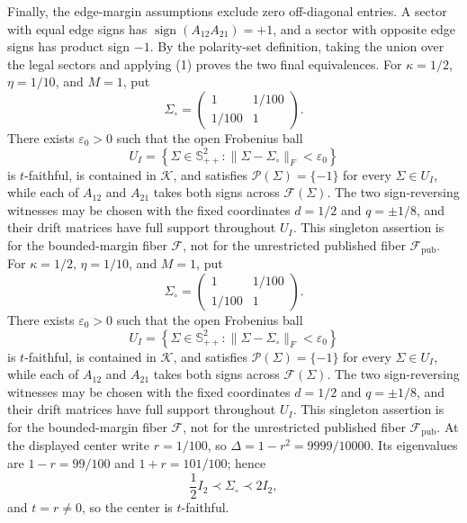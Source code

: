 Finally, the edge-margin assumptions exclude zero off-diagonal entries. A sector with equal edge signs has \(\operatorname{sign}(A_{12}A_{21})=+1\), and a sector with opposite edge signs has product sign \(-1\). By the polarity-set definition, taking the union over the legal sectors and applying (1) proves the two final equivalences.
For \(\kappa=1/2\), \(\eta=1/10\), and \(M=1\), put
\[
\Sigma_{\circ}=\begin{pmatrix}1&1/100\\1/100&1\end{pmatrix}.
\]
There exists \(\varepsilon_0>0\) such that the open Frobenius ball
\[
U_I=\left\{\Sigma\in\mathbb S_{++}^{2}:\lVert\Sigma-\Sigma_{\circ}\rVert_F<\varepsilon_0\right\}
\]
is \(t\)-faithful, is contained in \(\mathcal K\), and satisfies \(\mathcal P(\Sigma)=\{-1\}\) for every \(\Sigma\in U_I\), while each of \(A_{12}\) and \(A_{21}\) takes both signs across \(\mathcal F(\Sigma)\). The two sign-reversing witnesses may be chosen with the fixed coordinates \(d=1/2\) and \(q=\pm1/8\), and their drift matrices have full support throughout \(U_I\). This singleton assertion is for the bounded-margin fiber \(\mathcal F\), not for the unrestricted published fiber \(\mathcal F_{\mathrm{pub}}\).
For \(\kappa=1/2\), \(\eta=1/10\), and \(M=1\), put
\[
\Sigma_{\circ}=\begin{pmatrix}1&1/100\\1/100&1\end{pmatrix}.
\]
There exists \(\varepsilon_0>0\) such that the open Frobenius ball
\[
U_I=\left\{\Sigma\in\mathbb S_{++}^{2}:\lVert\Sigma-\Sigma_{\circ}\rVert_F<\varepsilon_0\right\}
\]
is \(t\)-faithful, is contained in \(\mathcal K\), and satisfies \(\mathcal P(\Sigma)=\{-1\}\) for every \(\Sigma\in U_I\), while each of \(A_{12}\) and \(A_{21}\) takes both signs across \(\mathcal F(\Sigma)\). The two sign-reversing witnesses may be chosen with the fixed coordinates \(d=1/2\) and \(q=\pm1/8\), and their drift matrices have full support throughout \(U_I\). This singleton assertion is for the bounded-margin fiber \(\mathcal F\), not for the unrestricted published fiber \(\mathcal F_{\mathrm{pub}}\).
At the displayed center write \(r=1/100\), so \(\Delta=1-r^2=9999/10000\). Its eigenvalues are \(1-r=99/100\) and \(1+r=101/100\); hence
\[
\frac12 I_2\prec\Sigma_{\circ}\prec2I_2,
\]
and \(t=r\ne0\), so the center is \(t\)-faithful.

